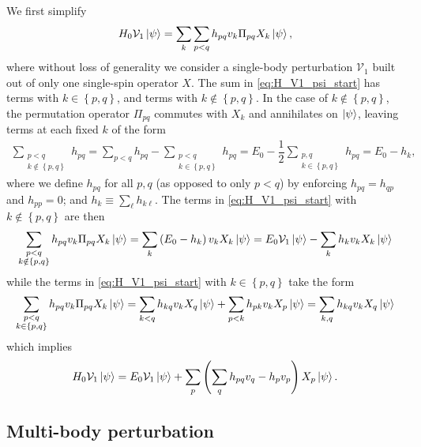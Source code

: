 \documentclass[nofootinbib,notitlepage,11pt]{revtex4-2}
\newcommand{\f}[2]{\dfrac{#1}{#2}} %
\newcommand{\p}[1]{\left(#1\right)} %
\renewcommand{\set}[1]{\left\{#1\right\}} %
\newcommand{\1}{\mathds{1}}
\newcommand{\V}{\mathcal{V}}
\begin{document}
We first simplify
\begin{align}
  H_0 \V_1 \ket\psi
  = \sum_k \sum_{p<q} h_{pq} v_k \Pi_{pq} X_k \ket\psi,
  \label{eq:H_V1_psi_start}
\end{align}
where without loss of generality we consider a single-body
perturbation $\V_1$ built out of only one single-spin operator $X$.
The sum in \eqref{eq:H_V1_psi_start} has terms with $k\in\set{p,q}$,
and terms with $k\notin\set{p,q}$.  In the case of $k\notin\set{p,q}$,
the permutation operator $\Pi_{pq}$ commutes with $X_k$ and
annihilates on $\ket\psi$, leaving terms at each fixed $k$ of the form
\begin{align}
  \sum_{\substack{p<q\\k\notin\set{p,q}}} h_{pq}
  = \sum_{p<q} h_{pq} - \sum_{\substack{p<q\\k\in\set{p,q}}} h_{pq}
  = E_0 - \f12 \sum_{\substack{p,q\\k\in\set{p,q}}} h_{pq}
  = E_0 - h_k,
\end{align}
where we define $h_{pq}$ for all $p,q$ (as opposed to only $p<q$) by
enforcing $h_{pq}=h_{qp}$ and $h_{pp}=0$; and
$h_k \equiv \sum_\ell h_{k\ell}$.  The terms in
\eqref{eq:H_V1_psi_start} with $k\notin\set{p,q}$ are then
\begin{align}
  \sum_{\substack{p<q\\k\notin\set{p,q}}}
  h_{pq} v_k \Pi_{pq} X_k \ket\psi
  = \sum_k \p{E_0 - h_k} v_k X_k \ket\psi
  = E_0 \V_1 \ket\psi - \sum_k h_k v_k X_k \ket\psi
\end{align}
while the terms in \eqref{eq:H_V1_psi_start} with $k\in\set{p,q}$ take
the form
\begin{align}
  \sum_{\substack{p<q\\k\in\set{p,q}}}
  h_{pq} v_k \Pi_{pq} X_k \ket\psi
  = \sum_{k<q} h_{kq} v_k X_q \ket\psi
  + \sum_{p<k} h_{pk} v_k X_p \ket\psi
  = \sum_{k,q} h_{kq} v_k X_q \ket\psi
\end{align}
which implies
\begin{align}
  H_0 \V_1 \ket\psi
  = E_0 \V_1 \ket\psi
  + \sum_p \p{\sum_{q} h_{pq} v_q - h_p v_p}
  X_p \ket\psi.
\end{align}

\subsection{Multi-body perturbation}
\label{sec:H_VM_psi}
\end{document}
